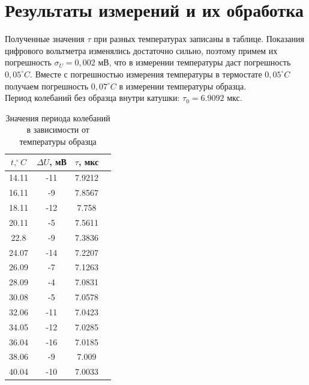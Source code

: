 \documentclass[a4paper, 12pt]{article}
\begin{document}
\section* {Результаты измерений и их обработка}
Полученные значения $\tau$ при разных температурах записаны в таблице. Показания цифрового вольтметра изменялись достаточно сильно, поэтому примем их погрешность $\sigma_U = 0,002$ мВ, что в измерении температуры даст погрешность $0,05^{\circ} C$. Вместе с погрешностью измерения температуры в термостате $0,05^{\circ} C$ получаем погрешность $0,07^{\circ} C$ в измерении температуры образца.\\
Период колебаний без образца внутри катушки: $\tau_0 = 6.9092$ мкс.
\begin{table}[h!]
    \centering
    \begin{tabular}{|c|c|c|c|}
        \hline
        $t, ^{\circ}C$ & $\Delta U$, мВ & $\tau$, мкс \\ \hline
		14.11 &	-11 &	7.9212 \\\hline
		16.11 &	-9 &	7.8567 \\\hline
		18.11 &	-12 &	7.758 \\\hline
		20.11 &	-5 &	7.5611 \\\hline
		22.8 &	-9 &	7.3836 \\\hline
		24.07 &	-14 &	7.2207 \\\hline
		26.09 &	-7 &	7.1263 \\\hline
		28.09 &	-4 &	7.0831 \\\hline
		30.08 &	-5 &	7.0578 \\\hline
		32.06 &	-11 &	7.0423 \\\hline
		34.05 &	-12 &	7.0285 \\\hline
		36.04 &	-16 &	7.0185 \\\hline
		38.06 &	-9 &	7.009 \\\hline
		40.04 &	-10 &	7.0033 \\\hline
    \end{tabular}
    \caption{Значения периода колебаний в зависимости от температуры образца}
\end{table}
\end{document}

